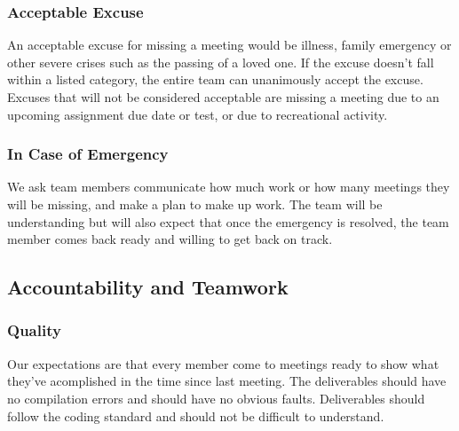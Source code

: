 \documentclass{article}
\begin{document}
\subsubsection*{Acceptable Excuse}


An acceptable excuse for missing a meeting would be illness, family emergency or other severe
crises such as the passing of a loved one. If the excuse doesn't fall within a listed category,
the entire team can unanimously accept the excuse. Excuses that will not be considered acceptable
are missing a meeting due to an upcoming assignment due date or test, or due to recreational
activity.

\subsubsection*{In Case of Emergency}


We ask team members communicate how much work or how many meetings they will be missing, and
make a plan to make up work. The team will be understanding but will also expect that once the
emergency is resolved, the team member comes back ready and willing to get back on track.

\subsection*{Accountability and Teamwork}

\subsubsection*{Quality} 


Our expectations are that every member come to meetings ready to show what they've acomplished
in the time since last meeting. The deliverables should have no compilation errors and should
have no obvious faults. Deliverables should follow the coding standard and should not be
difficult to understand.
\end{document}
